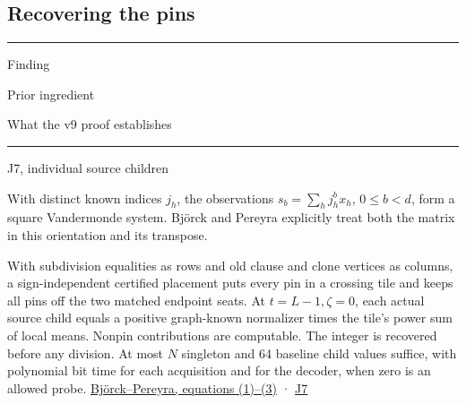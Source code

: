 \documentclass[11pt,a4paper]{article}
\newlength{\OfflineResearchTableWidth}
\newcommand{\OfflineResearchHeaderRule}{\noindent\rule{\linewidth}{0.45pt}\par}
\newcommand{\OfflineResearchRow}{\par}
\newenvironment{OfflineResearchTable}{%
  \par\medskip\begingroup\small\setlength{\parindent}{0pt}%
  \setlength{\parskip}{3pt plus 1pt minus .5pt}%
  \setlength{\OfflineResearchTableWidth}{\linewidth}%
}{%
  \par\endgroup\medskip%
}
\begin{document}
\subsection{Recovering the pins}\label{v9-recovering-the-pins}

\begin{OfflineResearchTable}
\OfflineResearchHeaderRule
\noindent%
\begin{minipage}[t]{0.31500\OfflineResearchTableWidth}\raggedright
Finding
\end{minipage}\hfill%
\begin{minipage}[t]{0.31500\OfflineResearchTableWidth}\raggedright
Prior ingredient
\end{minipage}\hfill%
\begin{minipage}[t]{0.31500\OfflineResearchTableWidth}\raggedright
What the v9 proof establishes
\end{minipage}%
\OfflineResearchRow
\nobreak
\OfflineResearchHeaderRule
\nobreak
\noindent%
\begin{minipage}[t]{0.31500\OfflineResearchTableWidth}\raggedright
J7, individual source children
\end{minipage}\hfill%
\begin{minipage}[t]{0.31500\OfflineResearchTableWidth}\raggedright
With distinct known indices \(j_h\),
the observations \(s_b=\sum_h j_h^b x_h\), \(0\le b<d\), form a square
Vandermonde system. Björck and Pereyra explicitly treat both the matrix
in this orientation and its transpose.
\end{minipage}\hfill%
\begin{minipage}[t]{0.31500\OfflineResearchTableWidth}\raggedright
With subdivision equalities as
rows and old clause and clone vertices as columns, a sign-independent
certified placement puts every pin in a crossing tile and keeps all pins
off the two matched endpoint seats. At \(t=L-1,\zeta=0\), each actual
source child equals a positive graph-known normalizer times the tile's
power sum of local means. Nonpin contributions are computable. The
integer is recovered before any division. At most \(N\) singleton and 64
baseline child values suffice, with polynomial bit time for each
acquisition and for the decoder, when zero is an allowed probe.
\href{https://www.ams.org/mcom/1970-24-112/S0025-5718-1970-0290541-1/S0025-5718-1970-0290541-1.pdf}{Björck--Pereyra,
equations (1)--(3)} ·
\hyperref[v9-j7-polynomial-acquisition-from-individual-source-children]{J7}
\end{minipage}%
\OfflineResearchRow
\noindent%
\begin{minipage}[t]{0.31500\OfflineResearchTableWidth}\raggedright

\end{minipage}
\end{OfflineResearchTable}
\end{document}
